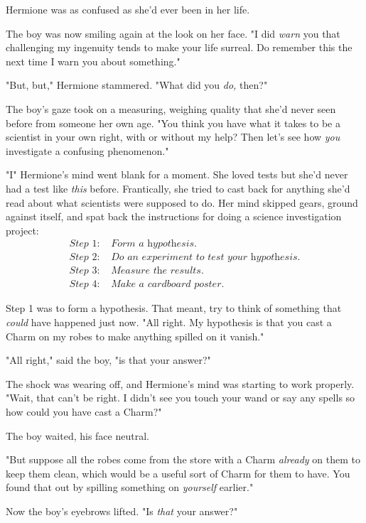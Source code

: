 Hermione was as confused as she'd ever been in her life.

The boy was now smiling again at the look on her face. "I did \emph{warn} you
that challenging my ingenuity tends to make your life surreal. Do remember this
the next time I warn you about something."

"But, but," Hermione stammered. "What did you \emph{do,} then?"

The boy's gaze took on a measuring, weighing quality that she'd never seen
before from someone her own age. "You think you have what it takes to be a
scientist in your own right, with or without my help? Then let's see how
\emph{you} investigate a confusing phenomenon."

"I{\el}" Hermione's mind went blank for a moment. She loved tests but she'd
never had a test like \emph{this} before. Frantically, she tried to cast back
for anything she'd read about what scientists were supposed to do. Her mind
skipped gears, ground against itself, and spat back the instructions for doing
a science investigation project:
\begin{align*}
\textit{Step 1:}&\textit{ Form a hypothesis.}\\
\textit{Step 2:}&\textit{ Do an experiment to test your hypothesis.}\\
\textit{Step 3:}&\textit{ Measure the results.}\\
\textit{Step 4:}&\textit{ Make a cardboard poster.}
\end{align*}

Step 1 was to form a hypothesis. That meant, try to think of something that
\emph{could} have happened just now. "All right. My hypothesis is that you cast
a Charm on my robes to make anything spilled on it vanish."

"All right," said the boy, "is that your answer?"

The shock was wearing off, and Hermione's mind was starting to work properly.
"Wait, that can't be right. I didn't see you touch your wand or say any spells
so how could you have cast a Charm?"

The boy waited, his face neutral.

"But suppose all the robes come from the store with a Charm \emph{already} on
them to keep them clean, which would be a useful sort of Charm for them to
have. You found that out by spilling something on \emph{yourself} earlier."

Now the boy's eyebrows lifted. "Is \emph{that} your answer?"

